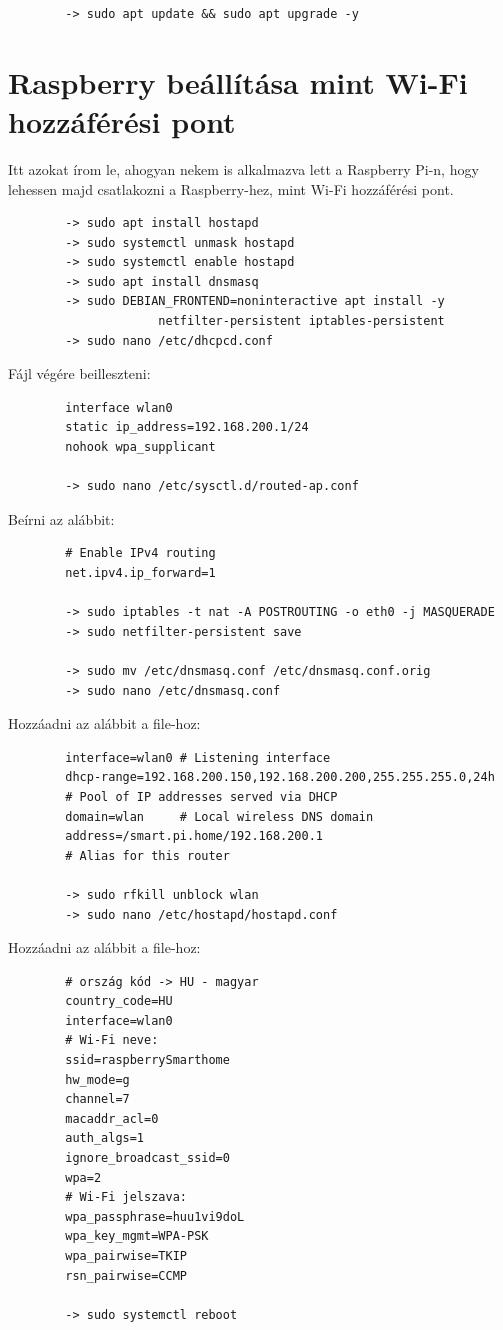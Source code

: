 \documentclass[
]{thesis-ekf}
\theoremstyle{definition}
\theoremstyle{remark}
\begin{document}
	\begin{verbatim}
		-> sudo apt update && sudo apt upgrade -y
	\end{verbatim}
	\section{Raspberry beállítása mint Wi-Fi hozzáférési pont}
	Itt azokat írom le, ahogyan nekem is alkalmazva lett a Raspberry Pi-n, hogy lehessen majd csatlakozni a Raspberry-hez, mint Wi-Fi hozzáférési pont.
	\begin{verbatim}
		-> sudo apt install hostapd
		-> sudo systemctl unmask hostapd
		-> sudo systemctl enable hostapd
		-> sudo apt install dnsmasq
		-> sudo DEBIAN_FRONTEND=noninteractive apt install -y
					 netfilter-persistent iptables-persistent
		-> sudo nano /etc/dhcpcd.conf
	\end{verbatim}
	Fájl végére beilleszteni: 
	\begin{verbatim}
		interface wlan0
		static ip_address=192.168.200.1/24
		nohook wpa_supplicant
		
		-> sudo nano /etc/sysctl.d/routed-ap.conf
	\end{verbatim}
	Beírni az alábbit:
	\begin{verbatim}
		# Enable IPv4 routing
		net.ipv4.ip_forward=1
		
		-> sudo iptables -t nat -A POSTROUTING -o eth0 -j MASQUERADE
		-> sudo netfilter-persistent save
		
		-> sudo mv /etc/dnsmasq.conf /etc/dnsmasq.conf.orig
		-> sudo nano /etc/dnsmasq.conf
	\end{verbatim}
	Hozzáadni az alábbit a file-hoz:
	\begin{verbatim}
		interface=wlan0 # Listening interface
		dhcp-range=192.168.200.150,192.168.200.200,255.255.255.0,24h
		# Pool of IP addresses served via DHCP
		domain=wlan     # Local wireless DNS domain
		address=/smart.pi.home/192.168.200.1
		# Alias for this router
		
		-> sudo rfkill unblock wlan
		-> sudo nano /etc/hostapd/hostapd.conf
	\end{verbatim}
	Hozzáadni az alábbit a file-hoz:
	\begin{verbatim}
		# ország kód -> HU - magyar
		country_code=HU
		interface=wlan0
		# Wi-Fi neve:
		ssid=raspberrySmarthome
		hw_mode=g
		channel=7
		macaddr_acl=0
		auth_algs=1
		ignore_broadcast_ssid=0
		wpa=2
		# Wi-Fi jelszava:
		wpa_passphrase=huu1vi9doL
		wpa_key_mgmt=WPA-PSK
		wpa_pairwise=TKIP
		rsn_pairwise=CCMP
		
		-> sudo systemctl reboot
	\end{verbatim}\cite{raspberry-as-wifi}
\end{document}
